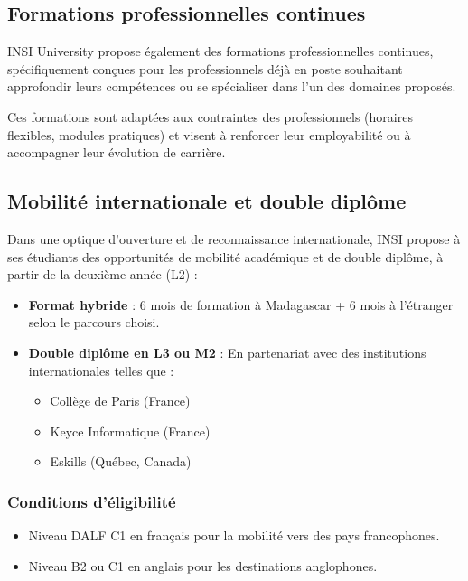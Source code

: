 \documentclass[a4paper,12pt]{article}
\begin{document}
\subsection{Formations professionnelles continues}

INSI University propose également des formations professionnelles continues, spécifiquement conçues pour les professionnels déjà en poste souhaitant approfondir leurs compétences ou se spécialiser dans l’un des domaines proposés.

Ces formations sont adaptées aux contraintes des professionnels (horaires flexibles, modules pratiques) et visent à renforcer leur employabilité ou à accompagner leur évolution de carrière.

\subsection{Mobilité internationale et double diplôme}

Dans une optique d’ouverture et de reconnaissance internationale, INSI propose à ses étudiants des opportunités de mobilité académique et de double diplôme, à partir de la deuxième année (L2) :

\begin{itemize}
    \item \textbf{Format hybride} : 6 mois de formation à Madagascar + 6 mois à l’étranger selon le parcours choisi.
    \item \textbf{Double diplôme en L3 ou M2} : En partenariat avec des institutions internationales telles que :
    \begin{itemize}
        \item Collège de Paris (France)
        \item Keyce Informatique (France)
        \item Eskills (Québec, Canada)
    \end{itemize}
\end{itemize}

\subsubsection*{Conditions d’éligibilité}
\begin{itemize}
    \item Niveau DALF C1 en français pour la mobilité vers des pays francophones.
    \item Niveau B2 ou C1 en anglais pour les destinations anglophones.
\end{itemize}
\end{document}
